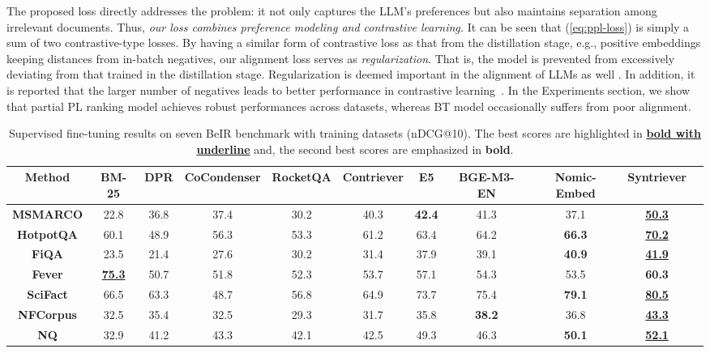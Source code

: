 The proposed loss directly addresses the problem: it not only captures the LLM's preferences but also maintains separation among irrelevant documents. Thus, \emph{our loss combines preference modeling and contrastive learning.} It can be seen that (\ref{eq:ppl-loss}) is simply a sum of two contrastive-type losses.
By having a similar form of contrastive loss as that from the distillation stage, e.g., positive embeddings keeping distances from in-batch negatives, our alignment loss serves as \emph{regularization}. 
That is, the model is prevented from excessively deviating from that trained in the distillation stage.
Regularization is deemed important in the alignment of LLMs as well \cite{ouyang2022training}. In addition, it is reported that the larger number of negatives leads to better performance in contrastive learning~\cite{he2020momentum}. 
In the Experiments section, we show that partial PL ranking model achieves robust performances across datasets, whereas BT model occasionally suffers from poor alignment.



\begin{table*}[t!]
\begin{adjustbox}{width=1.\textwidth,center}
\begin{tabular}{ccccccccccc}
\hline
\textbf{Method}   & BM-25 & DPR  & CoCondenser & RocketQA & Contriever & E5            & BGE-M3-EN & Nomic-Embed   & \textbf{Syntriever}             \\\hline
\textbf{MSMARCO}  & 22.8  & 36.8 & 37.4        & 30.2     & 40.3       & \textbf{42.4} & 41.3      & 37.1                     & \textbf{\underline{50.3}} \\
\textbf{HotpotQA} & 60.1  & 48.9 & 56.3        & 53.3     & 61.2       & 63.4          & 64.2      & \textbf{66.3}             & \textbf{\underline{70.2}} \\
\textbf{FiQA}     & 23.5  & 21.4 & 27.6        & 30.2     & 31.4       & 37.9          & 39.1      & \textbf{40.9}            & \textbf{\underline{41.9}} \\
\textbf{Fever}     &  \underline{\textbf{75.3}}  & 50.7    &      51.8   &   52.3   &    53.7   &   57.1  &     54.3  &    53.5  &    \textbf{60.3} \\
\textbf{SciFact}  & 66.5  & 63.3 & 48.7        & 56.8     & 64.9       & 73.7          & 75.4      & \textbf{79.1}             & \textbf{\underline{80.5}} \\
\textbf{NFCorpus} & 32.5  & 35.4 & 32.5        & 29.3     & 31.7       & 35.8          & \textbf{38.2}      & 36.8             & \textbf{\underline{43.3}} \\
\textbf{NQ}       & 32.9  & 41.2 & 43.3        & 42.1     & 42.5       & 49.3          & 46.3      & \textbf{50.1}             & \textbf{\underline{52.1}} \\\hline
\end{tabular}
\end{adjustbox}
\caption{Supervised fine-tuning results on seven BeIR benchmark with training datasets (nDCG@10). The best scores are highlighted in \underline{\textbf{bold with underline}} and, the second best scores are emphasized in \textbf{bold}.}
\label{tab:main_results}
\end{table*}


